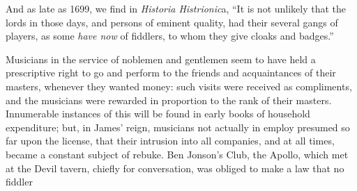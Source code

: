 And as late as 1699, we find in \textit{Historia Histrionic}a, “It is not unlikely that the
lords in those days, and persons of eminent quality, had their several gangs of
players, as some \textit{have now} of fiddlers, to whom they give cloaks and badges.”

Musicians in the service of noblemen and gentlemen seem to have held a
prescriptive right to go and perform to the friends and acquaintances of their
masters, whenever they wanted money: such visits were received as compliments,
and the musicians were rewarded in proportion to the rank of their masters.
Innumerable instances of this will be found in early books of household expenditure; 
but, in James’ reign, musicians not actually in employ presumed so far
upon the license, that their intrusion into all companies, and at all times, became
a constant subject of rebuke. Ben Jonson’s Club, the Apollo, which met at the
Devil tavern, chiefly for conversation, was obliged to make a law that no fiddler
